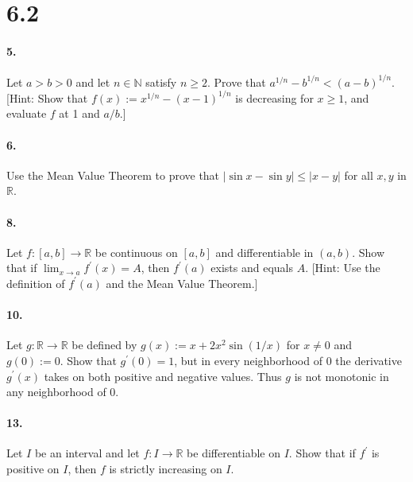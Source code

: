 \documentclass[12pt]{article}
\theoremstyle{remark}
\begin{document}
\section*{6.2}
\paragraph{5.} Let $a>b>0$ and let $n \in \mathbb{N}$ satisfy $n \geq 2$. Prove that $a^{1 / n}-b^{1 / n}<(a-b)^{1 / n}$. [Hint: Show that $f(x):=x^{1 / n}-(x-1)^{1 / n}$ is decreasing for $x \geq 1$, and evaluate $f$ at 1 and $a / b$.]

\paragraph{6.} Use the Mean Value Theorem to prove that $|\sin x-\sin y| \leq|x-y|$ for all $x, y$ in $\mathbb{R}$.

\paragraph{8.} Let $f:[a, b] \rightarrow \mathbb{R}$ be continuous on $[a, b]$ and differentiable in $(a, b)$. Show that if $\lim _{x \rightarrow a} f^{\prime}(x)=A$, then $f^{\prime}(a)$ exists and equals $A$. [Hint: Use the definition of $f^{\prime}(a)$ and the Mean Value Theorem.]

\paragraph{10.} Let $g: \mathbb{R} \rightarrow \mathbb{R}$ be defined by $g(x):=x+2 x^2 \sin (1 / x)$ for $x \neq 0$ and $g(0):=0$. Show that $g^{\prime}(0)=1$, but in every neighborhood of 0 the derivative $g^{\prime}(x)$ takes on both positive and negative values. Thus $g$ is not monotonic in any neighborhood of 0.

\paragraph{13.} Let $I$ be an interval and let $f: I \rightarrow \mathbb{R}$ be differentiable on $I$. Show that if $f^{\prime}$ is positive on $I$, then $f$ is strictly increasing on $I$.
\end{document}
